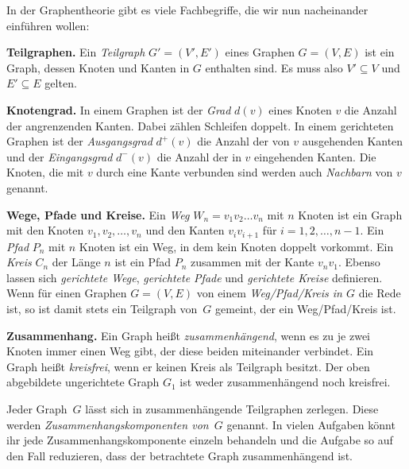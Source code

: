 In der Graphentheorie gibt es viele Fachbegriffe, die wir nun nacheinander einführen wollen:

\textbf{Teilgraphen.} Ein \emph{Teilgraph} $G'=(V',E')$ eines Graphen $G=(V,E)$ ist ein Graph, dessen Knoten und Kanten in $G$ enthalten sind. Es muss also $V' \subseteq V$ und $E'\subseteq E$ gelten.

\textbf{Knotengrad.} In einem Graphen ist der \emph{Grad} $d(v)$ eines Knoten $v$  die Anzahl der angrenzenden Kanten. Dabei zählen Schleifen doppelt. In einem gerichteten Graphen ist der \emph{Ausgangsgrad} $d^+(v)$ die Anzahl der von $v$ ausgehenden Kanten und der \emph{Eingangsgrad} $d^-(v)$ die Anzahl der in $v$ eingehenden Kanten. Die Knoten, die mit $v$ durch eine Kante verbunden sind werden auch \emph{Nachbarn} von $v$ genannt.
	
\textbf{Wege, Pfade und Kreise.} Ein \emph{Weg} $W_n=v_1v_2\ldots v_n$ mit $n$ Knoten ist ein Graph mit den Knoten $v_1,v_2,\dotsc,v_n$ und den Kanten $v_iv_{i+1}$ für $i=1,2,\dotsc,n-1$. Ein \emph{Pfad} $P_n$ mit $n$ Knoten ist ein Weg, in dem kein Knoten doppelt vorkommt. Ein \emph{Kreis} $C_n$ der Länge $n$ ist ein Pfad $P_{n}$ zusammen mit der Kante $v_nv_1$. Ebenso lassen sich \emph{gerichtete Wege}, \emph{gerichtete Pfade} und \emph{gerichtete Kreise} definieren.
Wenn für einen Graphen $G=(V,E)$ von einem \emph{Weg/Pfad/Kreis in $G$} die Rede ist, so ist damit stets ein Teilgraph von~$G$ gemeint, der ein Weg/Pfad/Kreis ist.
	
\textbf{Zusammenhang.} Ein Graph heißt \emph{zusammenhängend}, wenn es zu je zwei Knoten immer einen Weg gibt, der diese beiden miteinander verbindet. Ein Graph heißt \emph{kreisfrei}, wenn er keinen Kreis als Teilgraph besitzt. Der oben abgebildete ungerichtete Graph $G_1$ ist weder zusammenhängend noch kreisfrei.

Jeder Graph~$G$ lässt sich in zusammenhängende Teilgraphen zerlegen. Diese werden \emph{Zusammenhangskomponenten von~$G$} genannt. In vielen Aufgaben könnt ihr jede Zusammenhangskomponente einzeln behandeln und die Aufgabe so auf den Fall reduzieren, dass der betrachtete Graph zusammenhängend ist.
	

